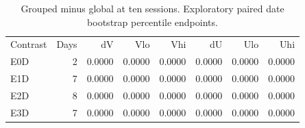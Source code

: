 \begin{table}[!ht]
\centering\small
\caption{Grouped minus global at ten sessions. Exploratory paired date bootstrap percentile endpoints.}
\begin{tabular}{lrrrrrrr}
\hline
Contrast & Days & dV & Vlo & Vhi & dU & Ulo & Uhi \\
E0D & 2 & 0.0000 & 0.0000 & 0.0000 & 0.0000 & 0.0000 & 0.0000 \\
E1D & 7 & 0.0000 & 0.0000 & 0.0000 & 0.0000 & 0.0000 & 0.0000 \\
E2D & 8 & 0.0000 & 0.0000 & 0.0000 & 0.0000 & 0.0000 & 0.0000 \\
E3D & 7 & 0.0000 & 0.0000 & 0.0000 & 0.0000 & 0.0000 & 0.0000 \\
\hline
\end{tabular}
\end{table}
